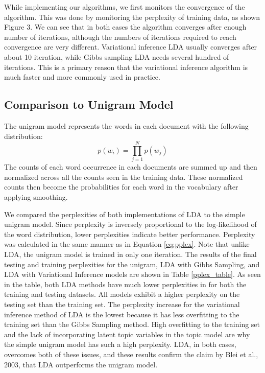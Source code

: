 \documentclass{article} %
\begin{document}
While implementing our algorithms, we first monitors the convergence of the algorithm. This was done by monitoring the perplexity of training data, as shown Figure 3. We can see that in both cases the algorithm converges after enough number of iterations, although the numbers of iterations required to reach convergence are very different. Variational inference LDA usually converges after about 10 iteration, while Gibbs sampling LDA needs several hundred of iterations. This is a primary reason that the variational inference algorithm is much faster and more commonly used in practice.

\subsection{Comparison to Unigram Model}
The unigram model represents the words in each document with the following distribution:
\begin{equation}
p(w_i) = \prod^{N}_{j=1}{p(w_j)}
\end{equation}
The counts of each word occurrence in each documents are summed up and then normalized across all the
 counts seen in the training data. These normalized counts then become the probabilities for each word in the 
 vocabulary after applying smoothing. 
 
We compared the perplexities of both implementations of LDA to the simple unigram model. 
Since perplexity is inversely proportional to the log-likelihood of the word distribution, lower perplexities 
indicate better performance. Perplexity was calculated in the same manner as in Equation \ref{eq:pplex}.
Note that unlike LDA, the unigram model is trained in only one iteration. The results of the final testing and 
training perplexities for the unigram, LDA with Gibbs Sampling, and LDA with Variational Inference models 
are shown in Table \ref{pplex_table}. As seen in the table, both LDA methods have much lower perplexities in
for both the training and testing datasets. All models exhibit a higher perplexity on the testing set than the 
training set. The perplexity increase for the variational inference method of LDA is the lowest because it has 
less overfitting to the training set than the Gibbs Sampling method. High overfitting to the training set and 
the lack of incorporating latent topic variables in the topic model are why the simple unigram model has such a high perplexity. LDA, in both cases, overcomes both of these issues, and these results confirm the claim by Blei et al., 2003, that LDA outperforms the unigram model.
\end{document}
